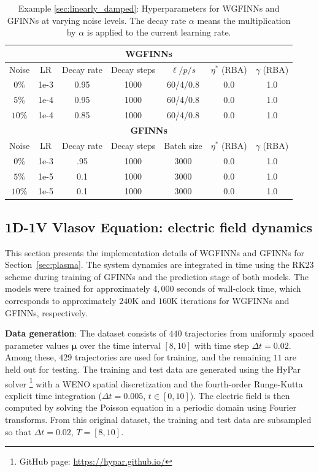 \documentclass[final]{siamltex}
\begin{document}
\begin{appendices}
\begin{table}[!t]
\centering
\begin{tabular}{|c||c|c|c|c|c|c|}
\hline
\multicolumn{7}{|c|}{\textbf{WGFINNs}} \\
\hline
Noise  & LR & Decay rate & Decay steps & $\ell/p/s$ & $\eta^*$ (RBA) & $\gamma$ (RBA) \\
\hline
$0\%$ & 1e-3   & 0.95 & 1000 & 60/4/0.8  & 0.0 & 1.0\\
\hline
$5\%$ & 1e-4  & 0.95 & 1000 &  60/4/0.8  & 0.0 &  1.0\\
\hline
$10\%$ & 1e-4  & 0.85 & 1000 &  60/4/0.8  & 0.0 & 1.0\\
\hline\hline
\multicolumn{7}{|c|}{\textbf{GFINNs}} \\
\hline
Noise& LR & Decay rate & Decay steps & Batch size & $\eta^*$ (RBA) & $\gamma$ (RBA) \\
\hline
$0\%$ & 1e-3 & .95 & 1000 & 3000 & 0.0  & 1.0 \\
\hline
$5\%$ & 1e-5 & 0.1 & 1000 & 3000 & 0.0 &  1.0 \\
\hline
$10\%$ & 1e-5 & 0.1 & 1000 & 3000 & 0.0  & 1.0 \\
\hline
\end{tabular}
\caption{Example \ref{sec:linearly_damped}: Hyperparameters for WGFINNs and GFINNs at varying noise levels. The decay rate $\alpha$ means the multiplication by $\alpha$ is applied to the current learning rate.}
\label{tab:Hyperparameters_LD}
\end{table}

\subsection{1D-1V Vlasov Equation: electric field dynamics}
\label{sec:app_plasma}
This section presents the implementation details of WGFINNs and GFINNs for Section~\ref{sec:plasma}. The system dynamics are integrated in time using the RK23 scheme during training of GFINNs and the prediction stage of both models.
The models were trained for approximately $4{,}000$ seconds of wall-clock time, which corresponds to approximately $240\text{K}$ and $160\text{K}$ iterations for WGFINNs and GFINNs, respectively. 


{\bf Data generation}: 
The dataset consists of $440$ trajectories from uniformly spaced parameter values $\boldsymbol{\mu}$ over the time interval $[8,10]$ with 
time step $\Delta t = 0.02$. Among these, $429$ trajectories are used for training, and the remaining $11$ are held out for testing.
The training and test data are generated using the HyPar solver \footnote{\label{ft:hypar}GitHub page: \url{https://hypar.github.io/}} with a WENO spatial
discretization and the fourth-order Runge-Kutta explicit time integration ($\Delta t = 0.005$, $t \in [0,10]$). The electric field is then computed by solving the Poisson equation in a periodic domain using Fourier transforms. From this original dataset, the training and test data are subsampled so that $\Delta t = 0.02$, $T = [8, 10]$.


\end{appendices}
\end{document}
